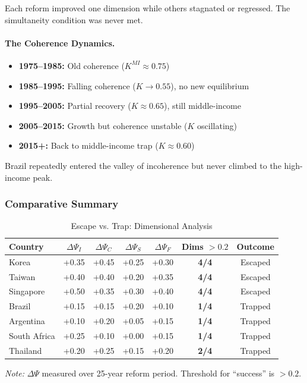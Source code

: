Each reform improved one dimension while others stagnated or regressed.
The simultaneity condition was never met.

\paragraph{The Coherence Dynamics.}
\begin{itemize}
    \item \textbf{1975--1985:} Old coherence ($K^{MI} \approx 0.75$)
    \item \textbf{1985--1995:} Falling coherence ($K \to 0.55$), no new equilibrium
    \item \textbf{1995--2005:} Partial recovery ($K \approx 0.65$), still middle-income
    \item \textbf{2005--2015:} Growth but coherence unstable ($K$ oscillating)
    \item \textbf{2015+:} Back to middle-income trap ($K \approx 0.60$)
\end{itemize}

Brazil repeatedly entered the valley of incoherence but never climbed to 
the high-income peak.

\subsubsection{Comparative Summary}

\begin{table}[htbp]
\centering
\caption{Escape vs. Trap: Dimensional Analysis}
\label{tab:escape-comparison}
\begin{tabular}{@{}lcccccc@{}}
\toprule
\textbf{Country} & $\Delta\Psi_I$ & $\Delta\Psi_C$ & $\Delta\Psi_S$ & $\Delta\Psi_F$ & \textbf{Dims $>0.2$} & \textbf{Outcome} \\
\midrule
Korea & +0.35 & +0.45 & +0.25 & +0.30 & \textbf{4/4} & Escaped \\
Taiwan & +0.40 & +0.40 & +0.20 & +0.35 & \textbf{4/4} & Escaped \\
Singapore & +0.50 & +0.35 & +0.30 & +0.40 & \textbf{4/4} & Escaped \\
\midrule
Brazil & +0.15 & +0.15 & +0.20 & +0.10 & \textbf{1/4} & Trapped \\
Argentina & +0.10 & +0.20 & +0.05 & +0.15 & \textbf{1/4} & Trapped \\
South Africa & +0.25 & +0.10 & +0.00 & +0.15 & \textbf{1/4} & Trapped \\
Thailand & +0.20 & +0.25 & +0.15 & +0.20 & \textbf{2/4} & Trapped \\
\bottomrule
\end{tabular}
\begin{flushleft}
\small\textit{Note:} $\Delta\Psi$ measured over 25-year reform period. Threshold for ``success'' is $>0.2$.
\end{flushleft}
\end{table}

